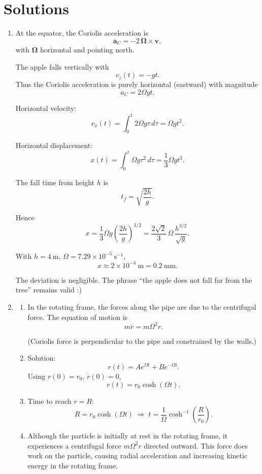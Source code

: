 \documentclass[../main.tex]{subfiles}
\begin{document}
\maketitle

\section*{Solutions}

\begin{enumerate}

\item At the equator, the Coriolis acceleration is
\[
\mathbf a_C = -2\,\boldsymbol{\Omega}\times\mathbf v,
\]
with \(\boldsymbol{\Omega}\) horizontal and pointing north.

The apple falls vertically with
\[
v_z(t)=-gt.
\]
Thus the Coriolis acceleration is purely horizontal (eastward) with magnitude
\[
a_C = 2\Omega g t.
\]

Horizontal velocity:
\[
v_x(t)=\int_0^t 2\Omega g \tau\,d\tau=\Omega g t^2.
\]

Horizontal displacement:
\[
x(t)=\int_0^t \Omega g \tau^2\,d\tau=\frac{1}{3}\Omega g t^3.
\]

The fall time from height \(h\) is
\[
t_f=\sqrt{\frac{2h}{g}}.
\]

Hence
\[
x=\frac{1}{3}\Omega g\left(\frac{2h}{g}\right)^{3/2}
=\frac{2\sqrt{2}}{3}\,\Omega\,\frac{h^{3/2}}{\sqrt{g}}.
\]

With \(h=4~\mathrm{m}\), \(\Omega=7.29\times10^{-5}~\mathrm{s^{-1}}\),
\[
x \approx 2\times10^{-4}\ \mathrm{m} = 0.2\ \mathrm{mm}.
\]

The deviation is negligible.  
The phrase “the apple does not fall far from the tree” remains valid :)

\newpage

\item 
\begin{enumerate}
\item[(a)] In the rotating frame, the forces along the pipe are due to the centrifugal force.
The equation of motion is
\[
m\ddot r = m\Omega^2 r.
\]

(Coriolis force is perpendicular to the pipe and constrained by the walls.)

\item[(b)] Solution:
\[
r(t)=A e^{\Omega t}+B e^{-\Omega t}.
\]
Using \(r(0)=r_0\), \(\dot r(0)=0\),
\[
r(t)=r_0\cosh(\Omega t).
\]

\item[(c)] Time to reach \(r=R\):
\[
R=r_0\cosh(\Omega t)
\;\Rightarrow\;
t=\frac{1}{\Omega}\cosh^{-1}\!\left(\frac{R}{r_0}\right).
\]

\item[(d)] Although the particle is initially at rest in the rotating frame, it experiences a centrifugal force \(m\Omega^2 r\) directed outward. This force does work on the particle, causing radial acceleration and increasing kinetic energy in the rotating frame.
\end{enumerate}

\end{enumerate}
\end{document}
